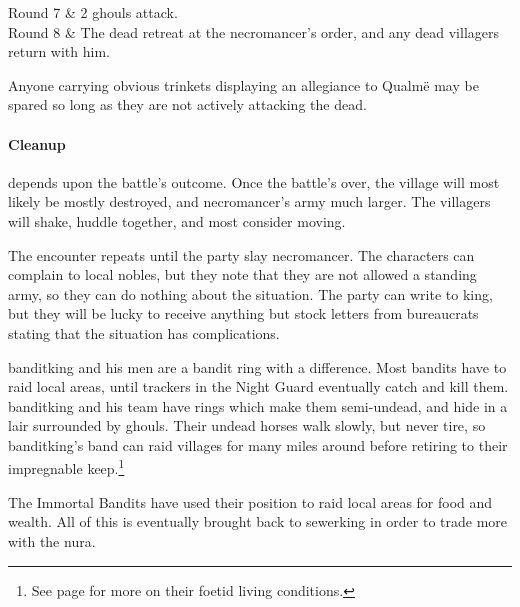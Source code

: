 \begin{multicols}{2}
\begin{rollchart}
	Round 7 & 2 ghouls attack. \\

	Round 8 & The dead retreat at the necromancer's order, and any dead villagers return with him. \\

\end{rollchart}

Anyone carrying obvious trinkets displaying an allegiance to Qualm\"e may be spared so long as they are not actively attacking the dead.

\paragraph{Cleanup} depends upon the battle's outcome.
Once the battle's over, the village will most likely be mostly destroyed, and \gls{necromancer}'s army much larger.  The villagers will shake, huddle together, and most consider moving.

The encounter repeats until the party slay \gls{necromancer}.
The characters can complain to local nobles, but they note that they are not allowed a standing army, so they can do nothing about the situation.
The party can write to \gls{king}, but they will be lucky to receive anything but stock letters from bureaucrats stating that the situation has complications.


\resumecontents[Town]

\stopcontents[sq]

\label{immortalbandits}

\stopcontents[Town]

\startcontents[sq]

\sqminitoc

\noindent
\Gls{banditking} and his men are a bandit ring with a difference.
Most bandits have to raid local areas, until trackers in the Night Guard eventually catch and kill them.
\Gls{banditking} and his team have rings which make them semi-undead, and hide in a lair surrounded by ghouls.
Their undead horses walk slowly, but never tire, so \gls{banditking}'s band can raid villages for many miles around before retiring to their impregnable keep.\footnote{See page \pageref{necromancers_lair} for more on their foetid living conditions.}

The Immortal Bandits have used their position to raid local areas for food and wealth.
All of this is eventually brought back to \gls{sewerking} in order to trade more with the nura.


\end{multicols}
